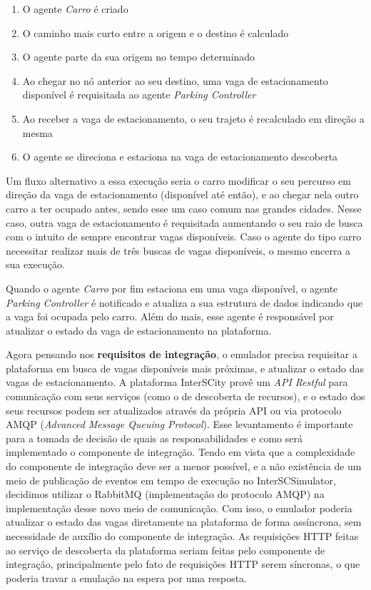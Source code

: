 \begin{enumerate}
    \item O agente \textit{Carro} é criado

    \item O caminho mais curto entre a origem e o destino é calculado

    \item O agente parte da sua origem no tempo determinado

    \item Ao chegar no nó anterior ao seu destino, uma vaga de estacionamento disponível é requisitada ao agente \textit{Parking Controller}

    \item Ao receber a vaga de estacionamento, o seu trajeto é recalculado em direção a mesma

    \item O agente se direciona e estaciona na vaga de estacionamento descoberta 
\end{enumerate}

Um fluxo alternativo a essa execução seria o carro modificar o seu percurso em direção da vaga de estacionamento (disponível até então), e ao chegar nela outro
carro a ter ocupado antes, sendo esse um caso comum nas grandes cidades.
Nesse caso, outra vaga de estacionamento é requisitada aumentando o seu raio de busca com o intuito de sempre encontrar vagas disponíveis.
Caso o agente do tipo carro necessitar realizar mais de três buscas de vagas disponíveis, o mesmo encerra a sua execução.

Quando o agente \textit{Carro} por fim estaciona em uma vaga disponível, o agente \textit{Parking Controller} é notificado e atualiza a sua estrutura de dados indicando
que a vaga foi ocupada pelo carro.
Além do mais, esse agente é responsável por atualizar o estado da vaga de estacionamento na plataforma.

Agora pensando nos \textbf{requisitos de integração}, o emulador precisa requisitar a plataforma em busca de vagas disponíveis mais próximas, e atualizar o estado
das vagas de estacionamento.
A plataforma InterSCity provê um \textit{API Restful} para comunicação com seus serviços (como o de descoberta de recursos), e o estado dos seus recursos podem ser
atualizados através da própria API ou via protocolo AMQP (\textit{Advanced Message Queuing Protocol}).
Esse levantamento é importante para a tomada de decisão de quais as responsabilidades e como será implementado o componente de integração.
Tendo em vista que a complexidade do componente de integração deve ser a menor possível, e a não existência de um meio de publicação de eventos em tempo de execução
no InterSCSimulator, decidimos utilizar o RabbitMQ (implementação do protocolo AMQP) na implementação desse novo meio de comunicação.
Com isso, o emulador poderia atualizar o estado das vagas diretamente na plataforma de forma assíncrona, sem necessidade de auxílio do componente de integração.
As requisições HTTP feitas ao serviço de descoberta da plataforma seriam feitas pelo componente de integração, principalmente pelo fato de requisições HTTP serem
síncronas, o que poderia travar a emulação na espera por uma resposta.

